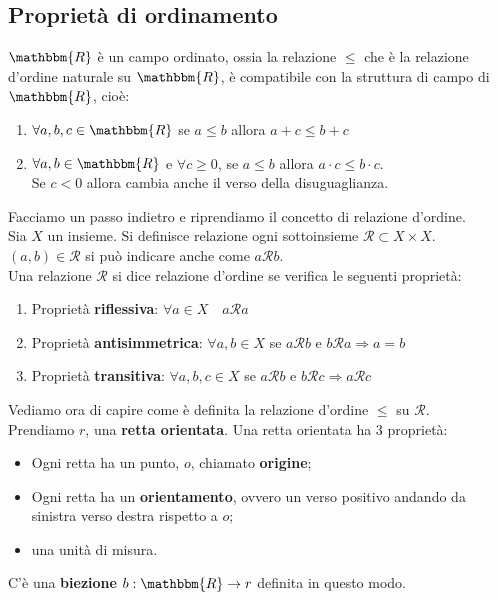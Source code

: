 \documentclass[12pt]{report}
\begin{document}
	\subsection{Proprietà di ordinamento}
	$\mathbbm{R}$ è un campo ordinato, ossia la relazione $\leq$ che è la relazione d'ordine naturale su $\mathbbm{R}$, è compatibile con la struttura di campo di $\mathbbm{R}$, cioè:
	\begin{enumerate}
		\item $\forall a,b,c \in \mathbbm{R}$ se $a \leq b$ allora $a + c \leq b + c$
		\item $\forall a,b \in \mathbbm{R}$ e $\forall c \geq 0$, se $a \leq b$ allora $a \cdot c \leq b \cdot c$. \\
		Se $c < 0$ allora cambia anche il verso della disuguaglianza.
	\end{enumerate}
	Facciamo un passo indietro e riprendiamo il concetto di relazione d'ordine. \\
	Sia $X$ un insieme. Si definisce relazione ogni sottoinsieme $\mathscr{R} \subset X \times X$. \\
	$(a,b) \in \mathscr{R}$ si può indicare anche come $a\mathscr{R}b$. \\
	Una relazione $\mathscr{R}$ si dice relazione d'ordine se verifica le seguenti proprietà:
	\begin{enumerate}
		\item Proprietà \textbf{riflessiva}: $\forall a \in X \quad a \mathscr{R} a$
		\item Proprietà \textbf{antisimmetrica}: $\forall a, b \in X$ se $a \mathscr{R} b$ e $b \mathscr{R} a \Rightarrow a = b$
		\item Proprietà \textbf{transitiva}: $\forall a, b, c \in X$ se $a \mathscr{R} b$ e $b \mathscr{R} c \Rightarrow a \mathscr{R} c$
	\end{enumerate}
	Vediamo ora di capire come è definita la relazione d'ordine $\leq$ su $\mathscr{R}$. \\
	Prendiamo $r$, una \textbf{retta orientata}. Una retta orientata ha 3 proprietà:
	\begin{itemize}
		\item Ogni retta ha un punto, $o$,  chiamato \textbf{origine};
		\item Ogni retta ha un \textbf{orientamento}, ovvero un verso positivo andando da sinistra verso destra rispetto a $o$;
		\item una unità di misura.
	\end{itemize}
	C'è una \textbf{biezione} $b: \mathbbm{R} \to r$ definita in questo modo. \\
\end{document}
